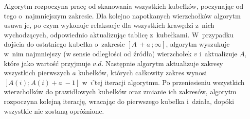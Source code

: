 Algorytm rozpoczyna pracę od skanowania wszystkich kubełków, poczynając od tego o~najmniejszym zakresie. Dla kolejno napotkanych wierzchołków algorytm usuwa je, po czym wykonuje relaksacje dla wszystkich krawędzi z~nich wychodzących, odpowiednio aktualizując tablicę z~kubełkami. W~przypadku dojścia do ostatniego kubełka o~zakresie $ \left [ A~+ a~; \infty \right] $, algorytm wyszukuje w~nim najmniejszy (w sensie odległości od źródła) wierzchołek $v$ i~aktualizuje $A$, które jako wartość przyjmuje $v.d$. Następnie algorytm aktualizuje zakresy wszystkich pierwszych $a$ kubełków, których całkowity zakres wynosi $ \left [ A \left( i \right) ; A \left( i \right) + a~- 1 \right] $ w~$i$'tej iteracji algorytmu. Po przeniesieniu wszystkich wierzchołków do prawidłowych kubełków oraz zmianie ich zakresów, algorytm rozpoczyna kolejną iterację, wracając do pierwszego kubełka i~działa, dopóki wszystkie nie zostaną opróżnione.

